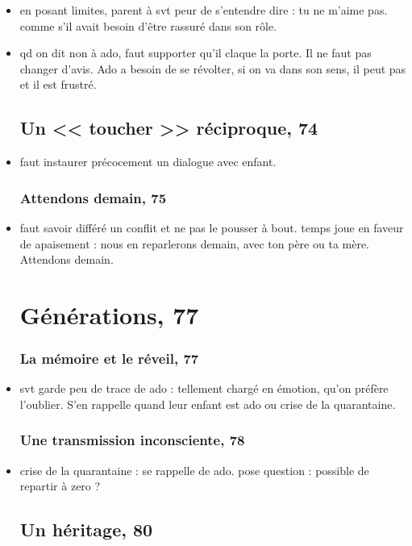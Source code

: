 \documentclass[12pt]{report}
\begin{document}
\begin{itemize}
\item en posant limites, parent à svt peur de s'entendre dire : tu ne m'aime pas. comme s'il avait besoin d'être rassuré dans son rôle.\\

\item qd on dit non à ado, faut supporter qu'il claque la porte. Il ne faut pas changer d'avis. Ado a besoin de se révolter, si on va dans son sens, il peut pas et il est frustré. 

\section{Un << toucher >> réciproque, 74} 

\item faut instaurer précocement un dialogue avec enfant. 

\subsection{Attendons demain, 75}

\item faut savoir différé un conflit et ne pas le pousser à bout.  temps joue en faveur de apaisement : nous en reparlerons demain, avec ton père ou ta mère. Attendons demain.


\chapter{Générations, 77}
\subsection{La mémoire et le réveil, 77}

\item svt garde peu de trace de ado : tellement chargé en émotion, qu'on préfère l'oublier. S'en rappelle quand leur enfant est ado ou crise de la quarantaine.

\subsection{Une transmission inconsciente, 78}

\item crise de la quarantaine : se rappelle de ado. pose question : possible de repartir à zero ?

\section{Un héritage, 80}


\end{itemize}
\end{document}
